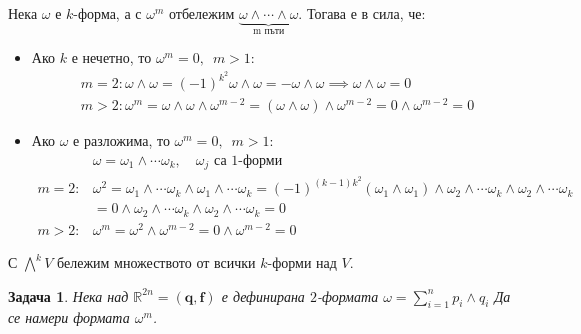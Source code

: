 \documentclass[12pt]{article}
\newtheorem{problem}{Задача}
\begin{document}
\begin{large}
Нека $\omega$ е $k$-форма, а с $\omega^m$ отбележим $\underbrace{\omega \wedge \cdots \wedge \omega}_{\text{m пъти}}$. Тогава е в сила, че:
\begin{itemize}
\item Ако $k$ е нечетно, то $\omega^m=0, \enspace m>1$:
\begin{align*}
&m=2: \omega \wedge \omega=(-1)^{k^2}\omega \wedge \omega=-\omega \wedge \omega \implies \omega \wedge \omega=0 \\ 
&m>2: \omega^m=\omega \wedge \omega \wedge \omega^{m-2}=(\omega \wedge \omega)\wedge \omega^{m-2}=0 \wedge \omega^{m-2}=0
\end{align*}
\item Ако $\omega$ е разложима, то $\omega^m=0, \enspace m>1$:
\begin{align*}
&\omega=\omega_1 \wedge \cdots \omega_k, \quad  \text{$\omega_j$ са $1$-форми} \\
m=2: &\omega^2=\omega_1 \wedge \cdots \omega_k \wedge \omega_1 \wedge \cdots \omega_k = (-1)^{(k-1)k^2} (\omega_1 \wedge \omega_1) \wedge \omega_2 \wedge \cdots \omega_k \wedge \omega_2 \wedge \cdots \omega_k \\
&=0 \wedge \omega_2 \wedge \cdots \omega_k \wedge \omega_2 \wedge \cdots \omega_k = 0 \\
m>2: &\omega^m=\omega^2 \wedge \omega^{m-2}=0 \wedge \omega^{m-2}=0
\end{align*}
\end{itemize}

С ${\bigwedge}^k V$ бележим множеството от всички $k$-форми над $V$.

\begin{problem}
Нека над $\mathbb{R}^{2n}=(\mathbf{q},\mathbf{f})$ е дефинирана $2$-формата $\omega=\sum_{i=1}^n p_i \wedge q_i$ Да се намери формата $\omega^m$.
\end{problem}


\end{large}
\end{document}
